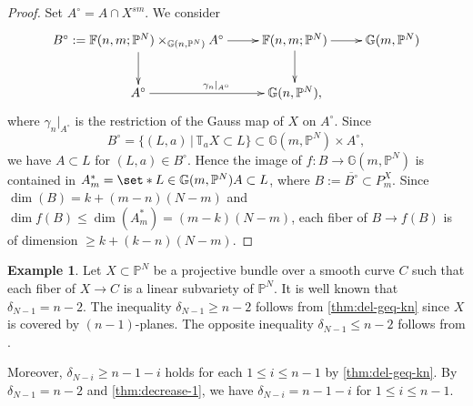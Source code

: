 \documentclass[a4paper,12pt]{amsart}
\theoremstyle{plain}
\theoremstyle{definition}
\newtheorem{ex}[ex]{Example}
\begin{document}
\begin{proof}
  Set $A^{\circ} = A \cap X^{sm}$.
  We consider
  \[
  \xymatrix{  B^{\circ}:= {{\mathbb{F}}(n,m;{{\mathbb{P}}^N})} \times_{{\mathbb{G}}(n,{{\mathbb{P}}^N})} A^{\circ} \ar[r] \ar[d]
    & {{\mathbb{F}}(n,m;{{\mathbb{P}}^N})} \ar[r] \ar[d] & {{\mathbb{G}}(m,{{\mathbb{P}}^N})}
    \\
    A^{\circ} \ar[r]^{\gamma_n|_{A^{\circ}}} & {{\mathbb{G}}(n,{{\mathbb{P}}^N})},
  }  \]  
  where $\gamma_n|_{A^{\circ}} $ is the restriction of the Gauss map of $X$ on $A^{\circ}$.
  Since 
  \[
  B^{\circ}=\{ (L, a) \, | \, {\mathbb {T}}_a X \subset L \} \subset {\mathbb {G}}(m,{\mathbb{P}}^N) \times A^{\circ},
  \]
  we have $A \subset L$ for $(L, a) \in B^{\circ}$.
  Hence the image of
  $f: B \rightarrow {{\mathbb{G}}(m,{{\mathbb{P}}^N})}$
  is contained in $A_m^* = \set*{L \in {{\mathbb{G}}(m,{{\mathbb{P}}^N})}}{A \subset L}$,
  where $B:=\overline{B^{\circ}} \subset P^X_m$.
  Since $\dim(B) = k+(m-n)(N-m)$
  and $\dim f(B) {\leqslant} \dim(A_m^*) = (m-k)(N-m)$,
  each fiber of $B \rightarrow f(B)$ is of dimension
  ${\geqslant} k+(k-n)(N-m)$.
\end{proof}

\begin{ex}\label{thm:cov-by-n-1}
  Let $X \subset {{\mathbb{P}}^N}$ be a projective bundle over a smooth curve $C$
  such that each fiber of $X \rightarrow C$ is a linear subvariety
  of ${{\mathbb{P}}^N}$.
  It is well known that $\delta_{N-1}=n-2$.
  The inequality $\delta_{N-1} {\geqslant} n-2$ follows from \autoref{thm:del-geq-kn} since
  $X$ is covered by $(n-1)$-planes.
  The opposite inequality $\delta_{N-1} {\leqslant} n-2$ follows from \cite[Chapter I, 2.3 Theorem b)]{Zak}. 
  
  Moreover,
  $\delta_{N-i} {\geqslant} n-1-i$ holds for each $1 {\leqslant} i {\leqslant} n-1$ by \autoref{thm:del-geq-kn}.
  By $\delta_{N-1}=n-2$ and \autoref{thm:decrease-1},
  we have $\delta_{N-i} = n-1-i$ for $1 {\leqslant} i {\leqslant} n-1$.
  

\end{ex}
\end{document}
